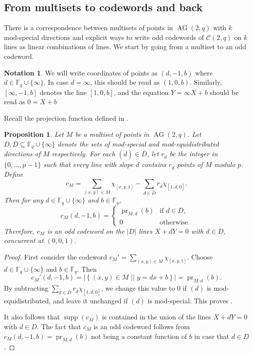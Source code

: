 \documentclass[12pt, a4paper]{article}
\newtheorem{prop}[thm]{Proposition}
\theoremstyle{definition}
\newtheorem{nota}[thm]{Notation}
\newcommand{\FF}{\mathbb F}
\newcommand{\sett}[2]{ \left\{ #1 \, \, || \, \, #2 \right \} }
\newcommand{\mc}{\mathcal C}
\newcommand{\fqi}{\FF_q \cup \{\infty\}}
\DeclareMathOperator{\supp}{supp}
\DeclareMathOperator{\pr}{pr}
\DeclareMathOperator{\AG}{AG}
\newcommand{\ag}{\AG}
\begin{document}
\subsection{From multisets to codewords and back}
 \label{Sec:SetsToCode}

There is a correspondence between multisets of points in $\ag(2,q)$ with $k$ mod-special directions and explicit ways to write odd codewords of $\mc(2,q)$ on $k$ lines as linear combinations of lines.
We start by going from a multiset to an odd codeword.

\begin{nota}
 We will write coordinates of points as $(d,-1,b)$ where $d \in \fqi$.
 In case $d = \infty$, this should be read as $(1,0,b)$.
 Similarly, $[\infty,-1,b]$ denotes the line $[1,0,b]$, and the equation $Y = \infty X + b$ should be read as $0 = X + b$
\end{nota}

Recall the projection function defined in .

\begin{prop}
 \label{Prop:SetToCode}
 Let $M$ be a multiset of points in $\ag(2,q)$.
 Let $D, \overline D \subseteq \fqi$ denote the sets of mod-special and mod-equidistributed directions of $M$ respectively.
 For each $(\overline d) \in \overline D$, let $r_{\overline d}$ be the integer in $\{0,\dots,p-1\}$ such that every line with slope $\overline d$ contains $r_{\overline d}$ points of $M$ modulo $p$.
 Define
 \[
  c_M = \sum_{(x,y) \in M} \chi_{[x,y,1]} - \sum_{\overline d \in \overline D} r_{\overline d} \chi_{[1,\overline d,0]}.
\]
 Then for any $d \in \fqi$ and $b \in \FF_q$,
 \begin{equation}
   \label{Eq:SetToCode}
  c_M(d,-1,b) = \begin{cases}
   \pr_{M,d}(b) & \text{if } d \in D, \\
   0 & \text{otherwise.}
  \end{cases}
 \end{equation}
 Therefore, $c_M$ is an odd codeword on the $|D|$ lines $X + dY = 0$ with $d \in D$, concurrent at $(0,0,1)$.
\end{prop}

\begin{proof}
 First consider the codeword $c_M' = \sum_{(x,y) \in M} \chi_{[x,y,1]}$.
 Choose $d \in \fqi$ and $b \in \FF_q$.
 Then
 \[
  c_M'(d,-1,b) = |\sett{(x,y) \in M}{y = dx + b}| = \pr_{M,d}(b).
 \]
 By subtracting $\sum_{\overline d \in \overline D} r_{\overline d} \chi_{[1,\overline d,0]}$, we change this value to 0 if $(d)$ is mod-equidistributed, and leave it unchanged if $(d)$ is mod-special.
 This proves .

 It also follows that $\supp(c_M)$ is contained in the union of the lines $X+dY = 0$ with $d \in D$.
 The fact that $c_M$ is an odd codeword follows from $c_M(d,-1,b) = \pr_{M,d}(b)$ not being a constant function of $b$ in case that $d \in D$.
\end{proof}
\end{document}
